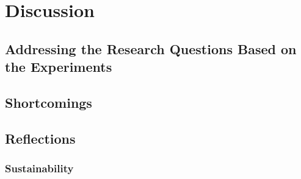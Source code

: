 \chapter{Discussion}
\label{chap:discussion}

\section{Addressing the Research Questions Based on the Experiments}

\section{Shortcomings}

\section{Reflections}

\subsection{Sustainability}

